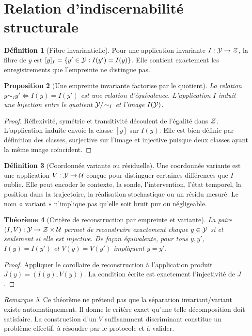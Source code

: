 \documentclass[11pt,oneside]{book}
\newtheorem{theoreme}{Théorème}[chapter]
\newtheorem{proposition}[theoreme]{Proposition}
\theoremstyle{definition}\newtheorem{definition}[theoreme]{Définition}\newtheorem{hypothese}[theoreme]{Hypothèse explicite}\newtheorem{convention}[theoreme]{Convention}\newtheorem{critere}[theoreme]{Critère}
\theoremstyle{remark}\newtheorem{remarque}[theoreme]{Remarque}\newtheorem{contreexemple}[theoreme]{Contre-exemple}
\begin{document}
\section{Relation d'indiscernabilité structurale}
\begin{definition}[Fibre invariantielle]
Pour une application invariante \(I:\mathcal Y\to\mathcal Z\), la fibre de \(y\) est \([y]_I=\{y'\in\mathcal Y:I(y')=I(y)\}\). Elle contient exactement les enregistrements que l'empreinte ne distingue pas.
\end{definition}
\begin{proposition}[Une empreinte invariante factorise par le quotient]
La relation \(y\sim_I y'\iff I(y)=I(y')\) est une relation d'équivalence. L'application \(I\) induit une bijection entre le quotient \(\mathcal Y/\!\sim_I\) et l'image \(I(\mathcal Y)\).
\end{proposition}
\begin{proof}
Réflexivité, symétrie et transitivité découlent de l'égalité dans \(\mathcal Z\). L'application induite envoie la classe \([y]\) sur \(I(y)\). Elle est bien définie par définition des classes, surjective sur l'image et injective puisque deux classes ayant la même image coïncident.\end{proof}
\begin{definition}[Coordonnée variante ou résiduelle]
Une coordonnée variante est une application \(V:\mathcal Y\to\mathcal U\) conçue pour distinguer certaines différences que \(I\) oublie. Elle peut encoder le contexte, la sonde, l'intervention, l'état temporel, la position dans la trajectoire, la réalisation stochastique ou un résidu mesuré. Le nom « variant » n'implique pas qu'elle soit bruit pur ou négligeable.
\end{definition}
\begin{theoreme}[Critère de reconstruction par empreinte et variante]
La paire \((I,V):\mathcal Y\to\mathcal Z\times\mathcal U\) permet de reconstruire exactement chaque \(y\in\mathcal Y\) si et seulement si elle est injective. De façon équivalente, pour tous \(y,y'\), \(I(y)=I(y')\) et \(V(y)=V(y')\) impliquent \(y=y'\).
\end{theoreme}
\begin{proof}
Appliquer le corollaire de reconstruction à l'application produit \(J(y)=(I(y),V(y))\). La condition écrite est exactement l'injectivité de \(J\).\end{proof}
\begin{remarque}
Ce théorème ne prétend pas que la séparation invariant/variant existe automatiquement. Il donne le critère exact qu'une telle décomposition doit satisfaire. La construction d'un \(V\) suffisamment discriminant constitue un problème effectif, à résoudre par le protocole et à valider.
\end{remarque}
\end{document}
